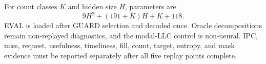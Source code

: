 \documentclass[10pt]{article}
\begin{document}
For count classes $K$ and hidden size $H$, parameters are
\[
9H^2+(191+K)H+K+118.
\]
EVAL is loaded after GUARD selection and decoded once.  Oracle decompositions
remain non-replayed diagnostics, and the modal-LLC control is non-neural.  IPC,
miss, request, usefulness, timeliness, fill, count, target, entropy, and mask
evidence must be reported separately after all five replay points complete.
\end{document}

